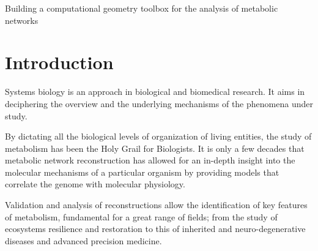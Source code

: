 \documentclass[a4paper, 12pt]{article}
\begin{document}
\begin{center}
    \Large{Building a computational geometry toolbox for the analysis of metabolic networks}
\end{center}








\section{Introduction}

Systems biology is an approach in biological and biomedical research. It aims in deciphering the overview and the underlying mechanisms of the phenomena under study. 

By dictating all the biological levels of organization of living entities, the study of metabolism has been the Holy Grail for Biologists. It is only a few decades that metabolic network reconstruction has allowed for an in-depth insight into the molecular mechanisms of a particular organism by providing models that correlate the genome with molecular physiology.

Validation and analysis of reconstructions allow the identification of key features of metabolism, fundamental for a great range of fields; from the study of ecosystems resilience and restoration to this of inherited and neuro-degenerative diseases and advanced precision medicine. 
\end{document}
